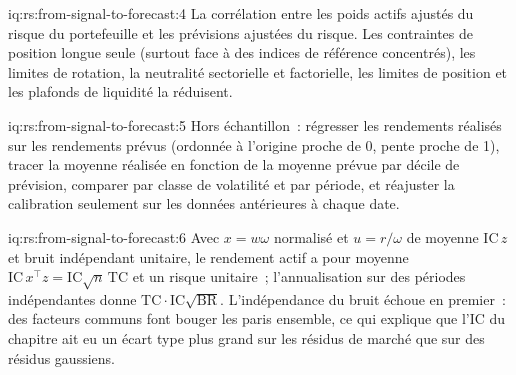 \begin{solution}{iq:rs:from-signal-to-forecast:4}
La corrélation entre les poids actifs ajustés du risque du portefeuille et les prévisions ajustées du risque. Les contraintes de position longue seule (surtout face à des indices de référence
concentrés), les limites de rotation, la neutralité sectorielle et factorielle, les limites de position et les plafonds de liquidité la réduisent.
\end{solution}

\begin{solution}{iq:rs:from-signal-to-forecast:5}
Hors échantillon~: régresser les rendements réalisés sur les rendements prévus (ordonnée à l'origine proche de 0, pente proche de 1), tracer la moyenne réalisée en fonction de la moyenne prévue par décile de prévision, comparer par
classe de volatilité et par période, et réajuster la calibration seulement sur les données antérieures à chaque date.
\end{solution}

\begin{solution}{iq:rs:from-signal-to-forecast:6}
Avec $x = w\omega$ normalisé et $u = r/\omega$ de moyenne $\mathrm{IC}\,z$ et bruit indépendant unitaire, le rendement actif a pour moyenne $\mathrm{IC}\,x^\top z =
\mathrm{IC}\sqrt n\,\mathrm{TC}$ et un risque unitaire~; l'annualisation sur des périodes indépendantes donne $\mathrm{TC}\cdot\mathrm{IC}\sqrt{\mathrm{BR}}$. L'indépendance du
bruit échoue en premier~: des facteurs communs font bouger les paris ensemble, ce qui explique que l'IC du chapitre ait eu un écart type plus grand sur les résidus de marché que sur
des résidus gaussiens.
\end{solution}
